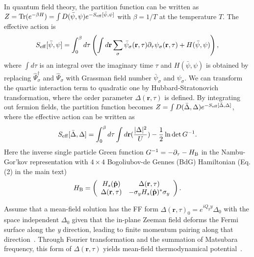 \documentclass[prl,aps,twocolumn,showpacs, floatfix]{revtex4}
\begin{document}
\begin{widetext}
In quantum field theory, the partition function can be written as $Z=\text{Tr%
}(e^{-\beta H})=\int D(\bar{\psi},\psi )e^{-S_{\rm eff}[\bar{\psi},\psi ]}$ with
$\beta =1/T$ at the temperature $T$. The effective action is
\begin{equation}
S_{\rm eff}[\bar{\psi},\psi ]=\int_{0}^{\beta }d\tau \left( \int d\mathbf{r}%
\sum_{\sigma }\bar{\psi}_{\sigma }(\mathbf{r},\tau )\partial _{\tau }\psi
_{\sigma }(\mathbf{r},\tau )+H(\bar{\psi},\psi )\right) ,
\end{equation}%
where $\int d\tau $ is an integral over the imaginary time $\tau $ and $H(%
\bar{\psi},\psi )$ is obtained by replacing $\hat{\Psi}_{\sigma }^{\dagger }$
and $\hat{\Psi}_{\sigma }$ with Grassman field number $\bar{\psi}_{\sigma }$
and $\psi _{\sigma }$. We can transform the quartic interaction term to
quadratic one by Hubbard-Stratonovich transformation, where the order
parameter $\Delta (\mathbf{r},\tau )$ is defined. By integrating out fermion
fields, the partition function becomes $Z=\int D(\bar{\Delta},\Delta
)e^{-S_{\rm eff}[\bar{\Delta},\Delta ]}$, where the effective action can be
written as
\begin{equation}
S_{\rm eff}[\bar{\Delta},\Delta ]=\int_{0}^{\beta }d\tau \int d\mathbf{r}(\frac{%
|\Delta |^{2}}{U})-\frac{1}{2}\ln \det {G}^{-1}.  \label{Seff}
\end{equation}%
Here the inverse single particle Green function $G^{-1}=-\partial _{\tau
}-H_{\rm B}$ in the Nambu-Gor'kov representation with $4\times 4$ Bogoliubov-de
Gennes (BdG) Hamiltonian (Eq.(2) in the main text)
\begin{equation}
H_{\rm B}=\left(
\begin{array}{cc}
H_{s}(\hat{\mathbf{p}}) & \Delta (\mathbf{r},\tau ) \\
\Delta (\mathbf{r},\tau ) & -\sigma _{y}H_{s}(\hat{\mathbf{p}})^{\ast
}\sigma _{y}%
\end{array}%
\right) .
\end{equation}

Assume that a mean-field solution has the FF form $\Delta (\mathbf{r},\tau
)_{0}=e^{iQ_{y}y}\Delta _{0}$ with the space independent $\Delta _{0}$ given
that the in-plane Zeeman field deforms the Fermi surface along the \textit{y}
direction, leading to finite momentum pairing along that direction~\cite%
{YongArx13S}. Through Fourier transformation and the summation of Matsubara
frequency, this form of $\Delta (\mathbf{r},\tau )$ yields mean-field
thermodynamical potential~\cite{Zheng2013PRAS,Yong2014PRLS}.


\end{widetext}
\end{document}
